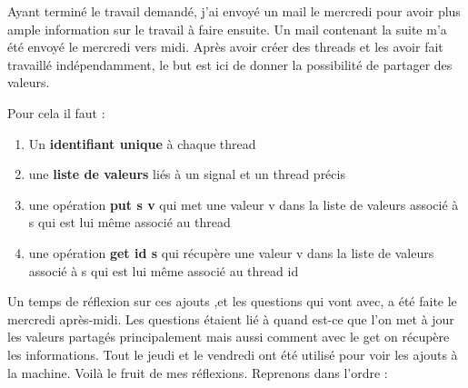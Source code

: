 \documentclass[10pt,a4paper]{article}
\begin{document}
			Ayant terminé le travail demandé, j'ai envoyé un mail le mercredi pour avoir plus ample information sur le travail à faire ensuite. Un mail contenant la suite m'a été envoyé le mercredi vers midi. Après avoir créer des threads et les avoir fait travaillé indépendamment, le but est ici de donner la possibilité de partager des valeurs.
			\smallbreak
			
			 Pour cela il faut :
			\begin{enumerate}
				\item Un \textbf{identifiant unique} à chaque thread
				\item une \textbf{liste de valeurs} liés à un signal et un thread précis
				\item une opération \textbf{put s v} qui met une valeur v dans la liste de valeurs associé à s qui est lui même associé au thread 
				\item une opération \textbf{get id s} qui récupère une valeur v dans la liste de valeurs associé à s qui est lui même associé au thread id 
			\end{enumerate}
			Un temps de réflexion sur ces ajouts ,et les questions qui vont avec, a été faite le mercredi après-midi. Les questions étaient lié à quand est-ce que l'on met à jour les valeurs partagés principalement mais aussi comment avec le get on récupère les informations. 
			\newpage
			Tout le jeudi et le vendredi ont été utilisé pour voir les ajouts à la machine. Voilà le fruit de mes réflexions.
			Reprenons dans l'ordre :
\end{document}
